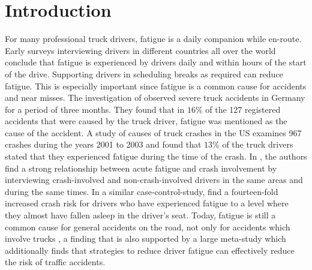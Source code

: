 
\chapter{Introduction\label{ch:introduction}}

For many professional truck drivers, fatigue is a daily companion while en-route. Early surveys \cite{williamson:2001, adams-guppy:2003} interviewing drivers in different countries all over the world conclude that fatigue is experienced by drivers daily and within hours of the start of the drive. Supporting drivers in scheduling breaks as required can reduce fatigue. This is especially important since fatigue is a common cause for accidents and near misses. The investigation of \cite{evers:2005} observed severe truck accidents in Germany for a period of three months. They found that in $16\%$ of the 127 registered accidents that were caused by the truck driver, fatigue was mentioned as the cause of the accident. A study of causes of truck crashes in the US \cite{federalmotorcarriersafetyadministrationfmcsa:2006} examines 967 crashes during the years 2001 to 2003 and found that $13\%$ of the truck drivers stated that they experienced fatigue during the time of the crash. In \cite{connor:2001}, the authors find a strong relationship between acute fatigue and crash involvement by interviewing crash-involved and non-crash-involved drivers in the same areas and during the same times. In a similar case-control-study, \cite{cummings:2001} find a fourteen-fold increased crash risk for drivers who have experienced fatigue to a level where they almost have fallen asleep in the driver's seat. Today, fatigue is still a common cause for general accidents on the road, not only for accidents which involve trucks \cite{statistischesbundesamtdestatis:2021}, a finding that is also supported by a large meta-study \cite{moradi:2019} which additionally finds that strategies to reduce driver fatigue can effectively reduce the risk of traffic accidents.

